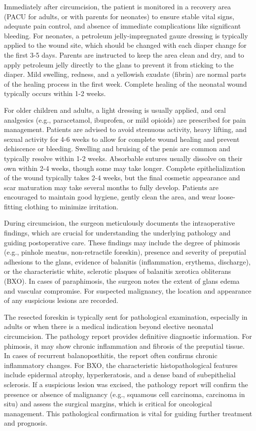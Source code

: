 Immediately after circumcision, the patient is monitored in a recovery area (PACU for adults, or with parents for neonates) to ensure stable vital signs, adequate pain control, and absence of immediate complications like significant bleeding. For neonates, a petroleum jelly-impregnated gauze dressing is typically applied to the wound site, which should be changed with each diaper change for the first 3-5 days. Parents are instructed to keep the area clean and dry, and to apply petroleum jelly directly to the glans to prevent it from sticking to the diaper. Mild swelling, redness, and a yellowish exudate (fibrin) are normal parts of the healing process in the first week. Complete healing of the neonatal wound typically occurs within 1-2 weeks.

For older children and adults, a light dressing is usually applied, and oral analgesics (e.g., paracetamol, ibuprofen, or mild opioids) are prescribed for pain management. Patients are advised to avoid strenuous activity, heavy lifting, and sexual activity for 4-6 weeks to allow for complete wound healing and prevent dehiscence or bleeding. Swelling and bruising of the penis are common and typically resolve within 1-2 weeks. Absorbable sutures usually dissolve on their own within 2-4 weeks, though some may take longer. Complete epithelialization of the wound typically takes 2-4 weeks, but the final cosmetic appearance and scar maturation may take several months to fully develop. Patients are encouraged to maintain good hygiene, gently clean the area, and wear loose-fitting clothing to minimize irritation.

During circumcision, the surgeon meticulously documents the intraoperative findings, which are crucial for understanding the underlying pathology and guiding postoperative care. These findings may include the degree of phimosis (e.g., pinhole meatus, non-retractile foreskin), presence and severity of preputial adhesions to the glans, evidence of balanitis (inflammation, erythema, discharge), or the characteristic white, sclerotic plaques of balanitis xerotica obliterans (BXO). In cases of paraphimosis, the surgeon notes the extent of glans edema and vascular compromise. For suspected malignancy, the location and appearance of any suspicious lesions are recorded.

The resected foreskin is typically sent for pathological examination, especially in adults or when there is a medical indication beyond elective neonatal circumcision. The pathology report provides definitive diagnostic information. For phimosis, it may show chronic inflammation and fibrosis of the preputial tissue. In cases of recurrent balanoposthitis, the report often confirms chronic inflammatory changes. For BXO, the characteristic histopathological features include epidermal atrophy, hyperkeratosis, and a dense band of subepithelial sclerosis. If a suspicious lesion was excised, the pathology report will confirm the presence or absence of malignancy (e.g., squamous cell carcinoma, carcinoma in situ) and assess the surgical margins, which is critical for oncological management. This pathological confirmation is vital for guiding further treatment and prognosis.

